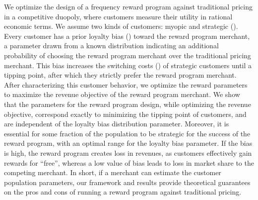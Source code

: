 We optimize the design of a frequency reward program against traditional pricing in a competitive duopoly, where customers measure their utility in rational economic terms.
We assume two kinds of customers: myopic and strategic (\cite{yilmaz2016upgrade}). 
Every customer has a prior loyalty bias (\cite{fader1993excess}) toward the reward program merchant, a parameter drawn from a known distribution indicating an additional probability of choosing the reward program merchant over the traditional pricing merchant.
This bias increases the switching costs (\cite{klemperer1995competition}) of strategic customers until a tipping point, after which they strictly prefer the reward program merchant. 
After characterizing this customer behavior, we optimize the reward parameters to maximize the revenue objective of the reward program merchant.
We show that the parameters for the reward program design, while optimizing the revenue objective, correspond exactly to minimizing the tipping point of customers, and are independent of the loyalty bias distribution parameter.
Moreover, it is essential for some fraction of the population to be strategic for the success of the reward program, with an optimal range for the loyalty bias parameter. 
If the bias is high, the reward program creates loss in revenues, as customers effectively gain rewards for ``free'', whereas a low value of bias leads to loss in market share to the competing merchant.
In short, if a merchant can estimate the customer population parameters, our framework and results provide theoretical guarantees on the pros and cons of running a reward program against traditional pricing.
